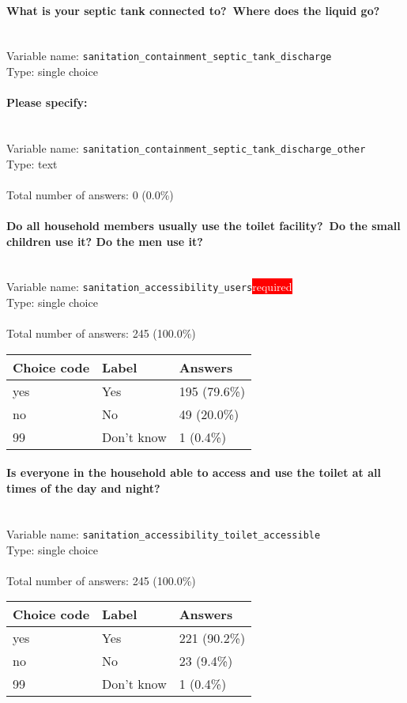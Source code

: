 \documentclass[11.5pt, a4paper]{scrartcl}
\begin{document}
\paragraph{What is your septic tank connected to? Where does the liquid go?}
\  \\Variable name: \texttt{sanitation\_containment\_septic\_tank\_discharge}\\
Type: single choice\\
\paragraph{Please specify:}
\  \\Variable name: \texttt{sanitation\_containment\_septic\_tank\_discharge\_other}\\
Type: text\\
\\Total number of answers: 0 (0.0\%)
\\[0.2em]\paragraph{Do all household members usually use the toilet facility? Do the small children use it? Do the men use it?}
\  \\Variable name: \texttt{sanitation\_accessibility\_users}\hfill\colorbox{red}{\small{\textcolor{white}{required}}}\\
 Type: single choice\\
\\Total number of answers: 245 (100.0\%)
\\[0.2em] \begin{tabular}{p{4cm}|p{8cm}|p{3cm}}
Choice code & Label & Answers \\
\hline
yes & Yes& \cellcolor{color3}195 (79.6\%)\\
\cellcolor{mygray} no & \cellcolor{mygray}No & \cellcolor{color0}49 (20.0\%)\\
99 & Don’t know& \cellcolor{color0}1 (0.4\%)\\
\end{tabular}
\paragraph{Is everyone in the household able to access and use the toilet at all times of the day and night? }
\  \\Variable name: \texttt{sanitation\_accessibility\_toilet\_accessible}\\
Type: single choice\\
\\Total number of answers: 245 (100.0\%)
\\[0.2em] \begin{tabular}{p{4cm}|p{8cm}|p{3cm}}
Choice code & Label & Answers \\
\hline
yes & Yes& \cellcolor{color4}221 (90.2\%)\\
\cellcolor{mygray} no & \cellcolor{mygray}No & \cellcolor{color0}23 (9.4\%)\\
99 & Don’t know& \cellcolor{color0}1 (0.4\%)\\
\end{tabular}
\end{document}
